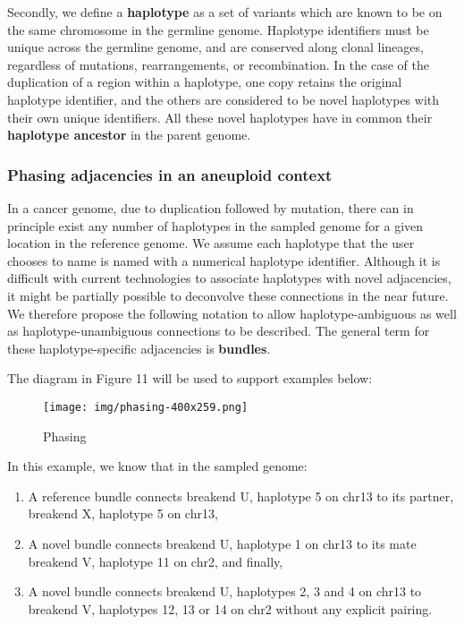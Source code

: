 \documentclass[8pt]{article}
\begin{document}
Secondly, we define a \textbf{haplotype} as a set of variants which are known to be on the same chromosome in the germline genome. Haplotype identifiers must be unique across the germline genome, and are conserved along clonal lineages, regardless of mutations, rearrangements, or recombination. In the case of the duplication of a region within a haplotype, one copy retains the original haplotype identifier, and the others are considered to be novel haplotypes with their own unique identifiers. All these novel haplotypes have in common their \textbf{haplotype ancestor} in the parent genome.

\subsubsection{Phasing adjacencies in an aneuploid context}
In a cancer genome, due to duplication followed by mutation, there can in principle exist any number of haplotypes in the sampled genome for a given location in the reference genome. We assume each haplotype that the user chooses to name is named with a numerical haplotype identifier. Although it is difficult with current technologies to associate haplotypes with novel adjacencies, it might be partially possible to deconvolve these connections in the near future. We therefore propose the following notation to allow haplotype-ambiguous as well as haplotype-unambiguous connections to be described. The general term for these haplotype-specific adjacencies is \textbf{bundles}.

The diagram in Figure 11 will be used to support examples below:

\begin{figure}[ht]
\centering
\texttt{[image: img/phasing-400x259.png]}
\caption{Phasing}
\end{figure}

In this example, we know that in the sampled genome:

\begin{enumerate}
  \item A reference bundle connects breakend U, haplotype 5 on chr13 to its partner, breakend X, haplotype 5 on chr13,
  \item A novel bundle connects breakend U, haplotype 1 on chr13 to its mate breakend V, haplotype 11 on chr2, and finally,
  \item A novel bundle connects breakend U, haplotypes 2, 3 and 4 on chr13 to breakend V, haplotypes 12, 13 or 14 on chr2 without any explicit pairing.
\end{enumerate}
\end{document}
